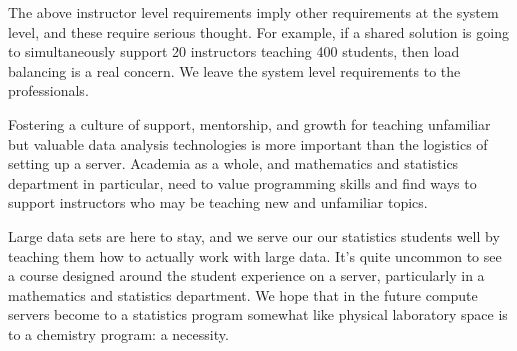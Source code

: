 \documentclass[12pt]{article}
\begin{document}
The above instructor level requirements imply other requirements at the system level, and these require serious thought.
For example, if a shared solution is going to simultaneously support 20 instructors teaching 400 students, then load balancing is a real concern.
We leave the system level requirements to the professionals.

Fostering a culture of support, mentorship, and growth for teaching unfamiliar but valuable data analysis technologies is more important than the logistics of setting up a server.
Academia as a whole, and mathematics and statistics department in particular, need to value programming skills and find ways to support instructors who may be teaching new and unfamiliar topics.

Large data sets are here to stay, and we serve our our statistics students well by teaching them how to actually work with large data.
It's quite uncommon to see a course designed around the student experience on a server, particularly in a mathematics and statistics department.
We hope that in the future compute servers become to a statistics program somewhat like physical laboratory space is to a chemistry program: a necessity.




\end{document}
